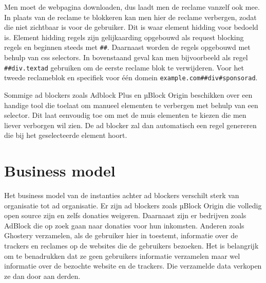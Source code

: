 \documentclass[pdftex,a4paper,12pt,twoside]{report}
\begin{document}
Men moet de webpagina downloaden, dus laadt men de reclame vanzelf ook mee. In plaats van de reclame te blokkeren kan men hier de reclame verbergen, zodat die niet zichtbaar is voor de gebruiker. Dit is waar element hidding voor bedoeld is. Element hidding regels zijn gelijkaarding opgebouwd als request blocking regels en beginnen steeds met \texttt{\#\#}. Daarnaast worden de regels opgebouwd met behulp van css selectors. In bovenstaand geval kan men bijvoorbeeld als regel \texttt{\#\#div.textad} gebruiken om de eerste reclame blok te verwijderen. Voor het tweede reclameblok en specifiek voor één domein \texttt{example.com\#\#div\#sponsorad}.

Sommige ad blockers zoals Adblock Plus en µBlock Origin beschikken over een handige tool die toelaat om manueel elementen te verbergen met behulp van een selector. Dit laat eenvoudig toe om met de muis elementen te kiezen die men liever verborgen wil zien. De ad blocker zal dan automatisch een regel genereren die bij het geselecteerde element hoort.

\section{Business model}
\label{sec:Business model}
Het business model van de instanties achter ad blockers verschilt sterk van organisatie tot ad organisatie. Er zijn ad blockers zoals µBlock Origin die volledig open source zijn en zelfs donaties weigeren. Daarnaast zijn er bedrijven zoals AdBlock die op zoek gaan naar donaties voor hun inkomsten. Anderen zoals Ghostery verzamelen, als de gebruiker hier in toestemt, informatie over de trackers en reclames op de websites die de gebruikers bezoeken. Het is belangrijk om te benadrukken dat ze geen gebruikers informatie verzamelen maar wel informatie over de bezochte website en de trackers. Die verzamelde data verkopen ze dan door aan derden.
\end{document}
